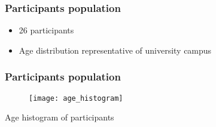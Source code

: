 \begin{frame}
	\frametitle{Participants population}

	\begin{itemize}
		\item 26 participants
		\item Age distribution representative of university campus
	\end{itemize}
\end{frame}

\begin{frame}
	\frametitle{Participants population}

	\begin{figure}
		\centering
		\texttt{[image: age\_histogram]}
	\end{figure}

	\centering Age histogram of participants
\end{frame}